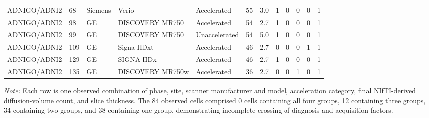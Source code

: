 \documentclass{article}
\providecommand{\DIFaddtex}[1]{{\protect\color{blue}#1}} %
\providecommand{\DIFadd}[1]{\texorpdfstring{\DIFaddtex{#1}}{#1}} %
\begin{document}
\begin{landscape}
\begin{longtable}{lllllrrrrrrr}
\DIFadd{ADNIGO/ADNI2 }& \DIFadd{68 }& \DIFadd{Siemens }& \DIFadd{Verio }& \DIFadd{Accelerated }& \DIFadd{55 }& \DIFadd{3.0 }& \DIFadd{1 }& \DIFadd{0 }& \DIFadd{0 }& \DIFadd{0 }& \DIFadd{1 }\\
\DIFadd{ADNIGO/ADNI2 }& \DIFadd{98 }& \DIFadd{GE }& \DIFadd{DISCOVERY MR750 }& \DIFadd{Accelerated }& \DIFadd{54 }& \DIFadd{2.7 }& \DIFadd{1 }& \DIFadd{0 }& \DIFadd{0 }& \DIFadd{0 }& \DIFadd{1 }\\
\DIFadd{ADNIGO/ADNI2 }& \DIFadd{99 }& \DIFadd{GE }& \DIFadd{DISCOVERY MR750 }& \DIFadd{Unaccelerated }& \DIFadd{54 }& \DIFadd{5.0 }& \DIFadd{1 }& \DIFadd{0 }& \DIFadd{0 }& \DIFadd{0 }& \DIFadd{1 }\\
\DIFadd{ADNIGO/ADNI2 }& \DIFadd{109 }& \DIFadd{GE }& \DIFadd{Signa HDxt }& \DIFadd{Accelerated }& \DIFadd{46 }& \DIFadd{2.7 }& \DIFadd{0 }& \DIFadd{0 }& \DIFadd{0 }& \DIFadd{1 }& \DIFadd{1 }\\
\DIFadd{ADNIGO/ADNI2 }& \DIFadd{129 }& \DIFadd{GE }& \DIFadd{SIGNA HDx }& \DIFadd{Accelerated }& \DIFadd{46 }& \DIFadd{2.7 }& \DIFadd{1 }& \DIFadd{0 }& \DIFadd{0 }& \DIFadd{0 }& \DIFadd{1 }\\
\DIFadd{ADNIGO/ADNI2 }& \DIFadd{135 }& \DIFadd{GE }& \DIFadd{DISCOVERY MR750w }& \DIFadd{Accelerated }& \DIFadd{36 }& \DIFadd{2.7 }& \DIFadd{0 }& \DIFadd{0 }& \DIFadd{1 }& \DIFadd{0 }& \DIFadd{1 }\\
\end{longtable}
\footnotesize\DIFadd{\textit{Note:} Each row is one observed combination of phase, site, scanner manufacturer and model, acceleration category, final NIfTI-derived diffusion-volume count, and slice thickness. The 84 observed cells comprised 0 cells containing all four groups, 12 containing three groups, 34 containing two groups, and 38 containing one group, demonstrating incomplete crossing of diagnosis and acquisition factors.
}\end{landscape}
\end{document}
